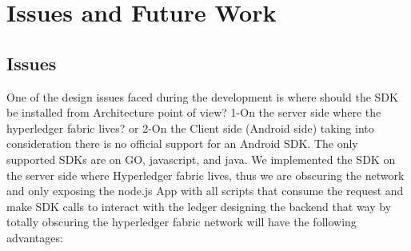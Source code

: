 \chapter{Issues and Future Work}


\section{Issues} 
One of the design issues faced during the development is where should the SDK be installed from Architecture point of view?
1-On the server side where the hyperledger fabric lives?  or 2-On the Client side (Android side) taking into consideration there is no official support for an Android SDK. The only supported SDKs are on GO, javascript, and java.
We implemented the SDK on the server side where Hyperledger fabric lives, thus we are obscuring the network and only exposing the node.js App with all scripts that consume the request and make SDK calls to interact with the ledger designing the backend that way by totally obscuring the hyperledger fabric network will have the following advantages: 

